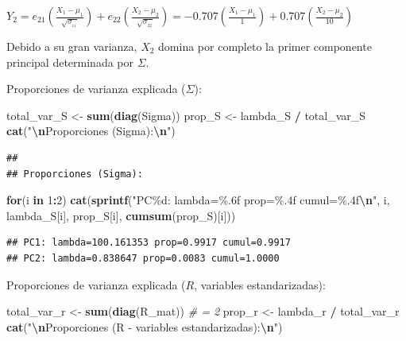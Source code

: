 \documentclass[
]{book}
\newenvironment{Shaded}{\begin{snugshade}}{\end{snugshade}}
\newcommand{\CommentTok}[1]{\textcolor[rgb]{0.56,0.35,0.01}{\textit{#1}}}
\newcommand{\ControlFlowTok}[1]{\textcolor[rgb]{0.13,0.29,0.53}{\textbf{#1}}}
\newcommand{\DecValTok}[1]{\textcolor[rgb]{0.00,0.00,0.81}{#1}}
\newcommand{\FunctionTok}[1]{\textcolor[rgb]{0.13,0.29,0.53}{\textbf{#1}}}
\newcommand{\NormalTok}[1]{#1}
\newcommand{\OtherTok}[1]{\textcolor[rgb]{0.56,0.35,0.01}{#1}}
\newcommand{\SpecialCharTok}[1]{\textcolor[rgb]{0.81,0.36,0.00}{\textbf{#1}}}
\newcommand{\StringTok}[1]{\textcolor[rgb]{0.31,0.60,0.02}{#1}}
\begin{document}
\(Y_2 = e_{21}\left( \frac{X_1-\mu_1}{\sqrt{\sigma_{_{11}}}} \right) + e_{22}\left( \frac{X_2-\mu_2}{\sqrt{\sigma_{_{22}}}} \right) = - 0.707\left( \frac{X_1-\mu_1}{1} \right) + 0.707\left( \frac{X_2-\mu_2}{10} \right)\)

Debido a su gran varianza, \(X_2\) domina por completo la primer componente principal determinada por \(\Sigma\).

Proporciones de varianza explicada (\(\Sigma\)):

\begin{Shaded}
\begin{Highlighting}[]
\NormalTok{total\_var\_S }\OtherTok{\textless{}{-}} \FunctionTok{sum}\NormalTok{(}\FunctionTok{diag}\NormalTok{(Sigma))}
\NormalTok{prop\_S }\OtherTok{\textless{}{-}}\NormalTok{ lambda\_S }\SpecialCharTok{/}\NormalTok{ total\_var\_S}
\FunctionTok{cat}\NormalTok{(}\StringTok{"}\SpecialCharTok{\textbackslash{}n}\StringTok{Proporciones (Sigma):}\SpecialCharTok{\textbackslash{}n}\StringTok{"}\NormalTok{)}
\end{Highlighting}
\end{Shaded}

\begin{verbatim}
## 
## Proporciones (Sigma):
\end{verbatim}

\begin{Shaded}
\begin{Highlighting}[]
\ControlFlowTok{for}\NormalTok{(i }\ControlFlowTok{in} \DecValTok{1}\SpecialCharTok{:}\DecValTok{2}\NormalTok{) }\FunctionTok{cat}\NormalTok{(}\FunctionTok{sprintf}\NormalTok{(}\StringTok{"PC\%d: lambda=\%.6f prop=\%.4f cumul=\%.4f}\SpecialCharTok{\textbackslash{}n}\StringTok{"}\NormalTok{,}
\NormalTok{                          i, lambda\_S[i], prop\_S[i], }\FunctionTok{cumsum}\NormalTok{(prop\_S)[i]))}
\end{Highlighting}
\end{Shaded}

\begin{verbatim}
## PC1: lambda=100.161353 prop=0.9917 cumul=0.9917
## PC2: lambda=0.838647 prop=0.0083 cumul=1.0000
\end{verbatim}

Proporciones de varianza explicada (\(R\), variables estandarizadas):

\begin{Shaded}
\begin{Highlighting}[]
\NormalTok{total\_var\_r }\OtherTok{\textless{}{-}} \FunctionTok{sum}\NormalTok{(}\FunctionTok{diag}\NormalTok{(R\_mat))  }\CommentTok{\# = 2}
\NormalTok{prop\_r }\OtherTok{\textless{}{-}}\NormalTok{ lambda\_r }\SpecialCharTok{/}\NormalTok{ total\_var\_r}
\FunctionTok{cat}\NormalTok{(}\StringTok{"}\SpecialCharTok{\textbackslash{}n}\StringTok{Proporciones (R {-} variables estandarizadas):}\SpecialCharTok{\textbackslash{}n}\StringTok{"}\NormalTok{)}
\end{Highlighting}
\end{Shaded}
\end{document}
